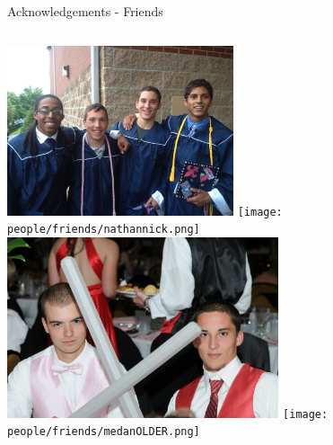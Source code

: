 \documentclass[aspectratio=169]{beamer}
\begin{document}
              

\begin{frame}{Acknowledgements - Friends}
    \begin{columns}
            \centering
            \includegraphics[width=0.5\textwidth]{people/friends/grad.png}
            \texttt{[image: people/friends/nathannick.png]}
            \centering
            \includegraphics[width=0.6\textwidth]{people/friends/medan.png}
            \texttt{[image: people/friends/medanOLDER.png]}
    \end{columns}
    
\end{frame}
\end{document}
